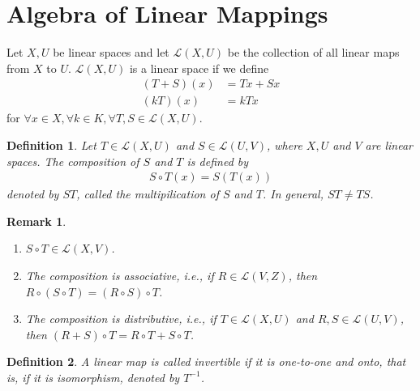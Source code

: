 \documentclass[11pt]{book}
\newtheorem{definition}{Definition}[section]
\newtheorem{remark}{Remark}[section]
\theoremstyle{definition}
\numberwithin{equation}{subsection}
\begin{document}
\medskip

\section{Algebra of Linear Mappings}
Let $X,U$ be linear spaces and let $\mathscr{L}(X,U)$ be the collection of all linear maps from $X$ to $U$. $\mathscr{L}(X,U)$ is a linear space if we define
\begin{align*}
    (T+S)(x) & = Tx + Sx \\
    (kT)(x) & = k T x
\end{align*}
for $\forall x\in X, \forall k\in K, \forall T,S\in \mathscr{L}(X,U)$.

\medskip

\begin{definition}
Let $T\in \mathscr{L}(X,U)$ and $S\in \mathscr{L}(U,V)$, where $X,U$ and $V$ are linear spaces. The composition of $S$ and $T$ is defined by 
\begin{align*}
    S \circ T(x) = S\left(T(x)\right)
\end{align*}
denoted by $ST$, called the multipilication of $S$ and $T$. In general, $ST\neq TS$.
\end{definition}
\begin{remark}
~\begin{enumerate}[label=(\arabic*)]
    \item $S\circ T \in \mathscr{L}(X,V)$.
    \item The composition is associative, i.e., if $R\in \mathscr{L}(V,Z)$, then $R\circ (S\circ T) = (R\circ S)\circ T$.
    \item The composition is distributive, i.e., if $T\in \mathscr{L}(X,U)$ and $R,S \in \mathscr{L}(U,V)$, then $(R+S)\circ T = R\circ T + S\circ T$.
\end{enumerate}
\end{remark}

\medskip

\begin{definition}
A linear map is called invertible if it is one-to-one and onto, that is, if it is isomorphism, denoted by $T^{-1}$.
\end{definition}

\medskip
\end{document}
